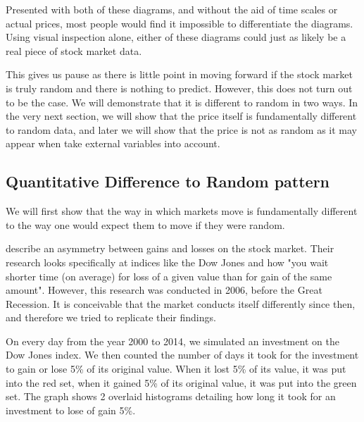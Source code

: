 \documentclass{report}
\begin{document}
Presented with both of these diagrams, and without the aid of time scales or actual prices, most people would find it impossible to differentiate the diagrams. Using visual inspection alone, either of these diagrams could just as likely be a real piece of stock market data.

This gives us pause as there is little point in moving forward if the stock market is truly random and there is nothing to predict. However, this does not turn out to be the case. We will demonstrate that it is different to random in two ways. In the very next section, we will show that the price itself is fundamentally different to random data, and later we will show that the price is not as random as it may appear when take external variables into account.

\subsection{Quantitative Difference to Random pattern}

We will first show that the way in which markets move is fundamentally different to the way one would expect them to move if they were random.

\citet{karpio2007gain} describe an asymmetry between gains and losses on the stock market. Their research looks specifically at indices like the Dow Jones and how "you wait shorter time (on average) for loss of a given value than for gain of the same amount". However, this research was conducted in 2006, before the Great Recession. It is conceivable that the market conducts itself differently since then, and therefore we tried to replicate their findings.

On every day from the year 2000 to 2014, we simulated an investment on the Dow Jones index. We then counted the number of days it took for the investment to gain or lose 5\% of its original value. When it lost 5\% of its value, it was put into the red set, when it gained 5\% of its original value, it was put into the green set. The graph shows 2 overlaid histograms detailing how long it took for an investment to lose of gain 5\%.
\end{document}
